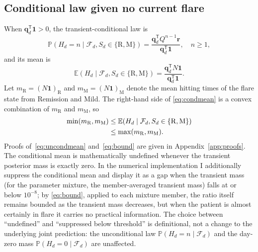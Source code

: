 \documentclass{ieeeaccess}
\newcommand{\R}{\mathrm{R}}
\newcommand{\M}{\mathrm{M}}
\newcommand{\trans}{\mathsf T}
\newcommand{\vect}[1]{\bm{#1}}
\newcommand{\Prb}{\mathbb P}
\newcommand{\E}{\mathbb E}
\begin{document}
\subsection{Conditional law given no current flare}
When $\vect{q}_d^{\trans}\vect{1}>0$, the transient-conditional law is
\[
\Prb(H_d=n\mid\mathcal F_d,S_d\in\{\R,\M\})
=\frac{\vect{q}_d^{\trans}Q^{n-1}\vect{r}}{\vect{q}_d^{\trans}\vect{1}},\quad n\ge1,
\]
and its mean is
\begin{equation}
\E(H_d\mid\mathcal F_d,S_d\in\{\R,\M\})
=\frac{\vect{q}_d^{\trans}N\vect{1}}{\vect{q}_d^{\trans}\vect{1}}.
\label{eq:condmean}
\end{equation}
Let $m_{\R}=(N\vect{1})_{\R}$ and $m_{\M}=(N\vect{1})_{\M}$ denote the mean hitting times of the flare state from Remission and Mild. The right-hand side of \eqref{eq:condmean} is a convex combination of $m_{\R}$ and $m_{\M}$, so
\begin{align}
\min(m_{\R},m_{\M})
&\le \E(H_d\mid\mathcal F_d,S_d\in\{\R,\M\}) \notag\\
&\le\max(m_{\R},m_{\M}).
\label{eq:bound}
\end{align}
Proofs of~\eqref{eq:uncondmean} and~\eqref{eq:bound} are given in Appendix~\ref{app:proofs}. The conditional mean is mathematically undefined whenever the transient posterior mass is exactly zero. In the numerical implementation I additionally suppress the conditional mean and display it as a gap when the transient mass (for the parameter mixture, the member-averaged transient mass) falls at or below $10^{-8}$; by \eqref{eq:bound}, applied to each mixture member, the ratio itself remains bounded as the transient mass decreases, but when the patient is almost certainly in flare it carries no practical information. The choice between ``undefined'' and ``suppressed below threshold'' is definitional, not a change to the underlying joint prediction: the unconditional law $\Prb(H_d=n\mid\mathcal F_d)$ and the day-zero mass $\Prb(H_d=0\mid\mathcal F_d)$ are unaffected.
\end{document}
